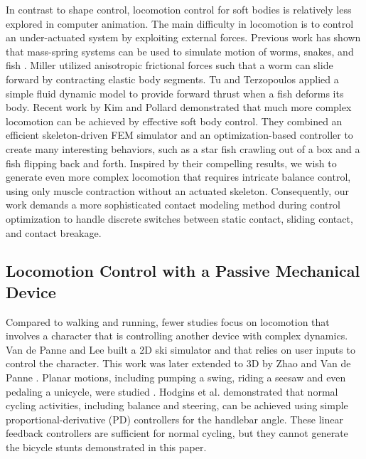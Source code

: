 In contrast to shape control, locomotion control for soft bodies is
relatively less explored in computer animation. The main difficulty in
locomotion is to control an under-actuated system by exploiting
external forces. Previous work has shown that mass-spring systems can
be used to simulate motion of worms, snakes, and fish
\cite{Miller:1988,Tu:1994,Grzeszczuk:1995}. Miller
\cite{Miller:1988} utilized anisotropic frictional forces such
that a worm can slide forward by contracting elastic body segments. Tu
and Terzopoulos \cite{Tu:1994} applied a simple fluid dynamic
model to provide forward thrust when a fish deforms its body. Recent
work by Kim and Pollard \cite{Kim:2011:DCO,Kim:2011} demonstrated
that much more complex locomotion can be achieved by effective soft
body control. They combined an efficient skeleton-driven FEM simulator
and an optimization-based controller to create many interesting
behaviors, such as a star fish crawling out of a box and a fish
flipping back and forth. Inspired by their compelling results, we
wish to generate even more complex locomotion that requires intricate
balance control, using only muscle contraction without an actuated
skeleton. Consequently, our work demands a more sophisticated contact
modeling method during control optimization to handle discrete
switches between static contact, sliding contact, and contact
breakage.

\subsection{Locomotion Control with a Passive Mechanical Device} Compared to walking and running, fewer studies focus on locomotion that involves a character that is controlling another device with complex dynamics. Van de Panne and Lee \cite{vandepanne:2003} built a 2D ski simulator and that relies on user inputs to control the character. This work was later extended to 3D by Zhao and Van de Panne \cite{Zhao:2005}. Planar motions, including pumping a swing, riding a seesaw and even pedaling a unicycle, were studied \cite{Hodgins:1992}. Hodgins et al. \cite{Hodgins:1995:AHA} demonstrated that normal cycling activities, including balance and steering, can be achieved using simple proportional-derivative (PD) controllers for the handlebar angle. These linear feedback controllers are sufficient for normal cycling, but they cannot generate the bicycle stunts demonstrated in this paper.

